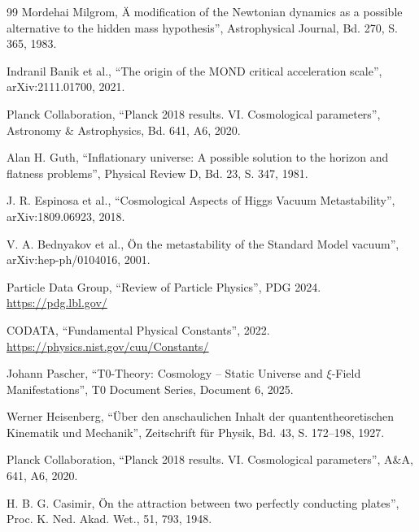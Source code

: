 \begin{thebibliography}{99}
		 Mordehai Milgrom, Ä modification of the Newtonian dynamics as a possible alternative to the hidden mass hypothesis'', Astrophysical Journal, Bd. 270, S. 365, 1983.
		
		 Indranil Banik et al., ``The origin of the MOND critical acceleration scale'', arXiv:2111.01700, 2021.
		
		 Planck Collaboration, ``Planck 2018 results. VI. Cosmological parameters'', Astronomy \& Astrophysics, Bd. 641, A6, 2020.
		
		 Alan H. Guth, ``Inflationary universe: A possible solution to the horizon and flatness problems'', Physical Review D, Bd. 23, S. 347, 1981.
		
		 J. R. Espinosa et al., ``Cosmological Aspects of Higgs Vacuum Metastability'', arXiv:1809.06923, 2018.
		
		 V. A. Bednyakov et al., Ön the metastability of the Standard Model vacuum'', arXiv:hep-ph/0104016, 2001.
		
		 Particle Data Group, ``Review of Particle Physics'', PDG 2024. \url{https://pdg.lbl.gov/}
		
		 CODATA, ``Fundamental Physical Constants'', 2022. \url{https://physics.nist.gov/cuu/Constants/}
		
		 Johann Pascher, ``T0-Theory: Cosmology – Static Universe and $\xi$-Field Manifestations'', T0 Document Series, Document 6, 2025. 
		
		 Werner Heisenberg, ``Über den anschaulichen Inhalt der quantentheoretischen Kinematik und Mechanik'', Zeitschrift für Physik, Bd. 43, S. 172–198, 1927.
		
		 Planck Collaboration, ``Planck 2018 results. VI. Cosmological parameters'', A\&A, 641, A6, 2020.
		
		 H. B. G. Casimir, Ön the attraction between two perfectly conducting plates'', Proc. K. Ned. Akad. Wet., 51, 793, 1948.
		
	\end{thebibliography}
